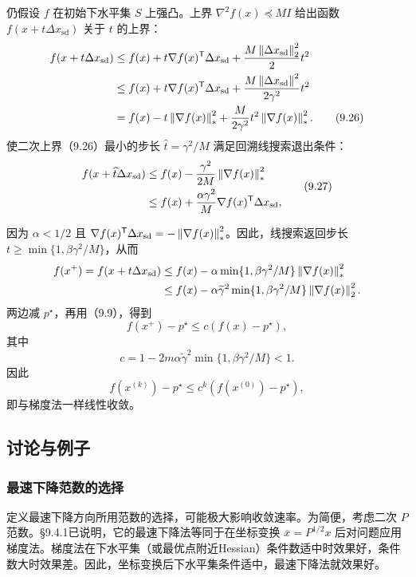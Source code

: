 仍假设 $f$ 在初始下水平集 $S$ 上强凸。上界 $\nabla^2f(x)\preceq MI$ 给出函数 $f(x+t\Delta x_{\mathrm{sd}})$ 关于 $t$ 的上界：
\begin{align}
f(x+t\Delta x_{\mathrm{sd}})
&\le f(x)+t\nabla f(x)^\mathsf T\Delta x_{\mathrm{sd}}
+\frac{M\left\lVert \Delta x_{\mathrm{sd}}\right\rVert_2^2}{2}t^2\notag\\
&\le f(x)+t\nabla f(x)^\mathsf T\Delta x_{\mathrm{sd}}
+\frac{M\left\lVert \Delta x_{\mathrm{sd}}\right\rVert^2}{2\gamma^2}t^2\notag\\
&=f(x)-t\left\lVert \nabla f(x)\right\rVert_*^2
+\frac{M}{2\gamma^2}t^2\left\lVert \nabla f(x)\right\rVert_*^2.\tag{9.26}
\end{align}
使二次上界（9.26）最小的步长 $\widehat t=\gamma^2/M$ 满足回溯线搜索退出条件：
\begin{equation}
\begin{split}
f(x+\widehat t\Delta x_{\mathrm{sd}})
&\le f(x)-\frac{\gamma^2}{2M}\left\lVert \nabla f(x)\right\rVert_*^2\\
&\le f(x)+\frac{\alpha\gamma^2}{M}\nabla f(x)^\mathsf T\Delta x_{\mathrm{sd}},
\end{split}\tag{9.27}
\end{equation}

因为 $\alpha<1/2$ 且 $\nabla f(x)^\mathsf T\Delta x_{\mathrm{sd}}=-\left\lVert \nabla f(x)\right\rVert_*^2$。因此，线搜索返回步长 $t\ge\min\{1,\beta\gamma^2/M\}$，从而
\[
\begin{aligned}
f(x^+)=f(x+t\Delta x_{\mathrm{sd}})
&\le f(x)-\alpha\min\{1,\beta\gamma^2/M\}\left\lVert \nabla f(x)\right\rVert_*^2\\
&\le f(x)-\alpha\widetilde\gamma^2\min\{1,\beta\gamma^2/M\}
\left\lVert \nabla f(x)\right\rVert_2^2.
\end{aligned}
\]
两边减 $p^\star$，再用（9.9），得到
\[
f(x^+)-p^\star\le c(f(x)-p^\star),
\]
其中
\[
c=1-2m\alpha\widetilde\gamma^2\min\{1,\beta\gamma^2/M\}<1.
\]
因此
\[
f(x^{(k)})-p^\star\le c^k(f(x^{(0)})-p^\star),
\]
即与梯度法一样线性收敛。

\subsection{讨论与例子}
\subsubsection*{最速下降范数的选择}
定义最速下降方向所用范数的选择，可能极大影响收敛速率。为简便，考虑二次 $P$ 范数。§9.4.1已说明，它的最速下降法等同于在坐标变换 $\overline x=P^{1/2}x$ 后对问题应用梯度法。梯度法在下水平集（或最优点附近Hessian）条件数适中时效果好，条件数大时效果差。因此，坐标变换后下水平集条件适中，最速下降法就效果好。

